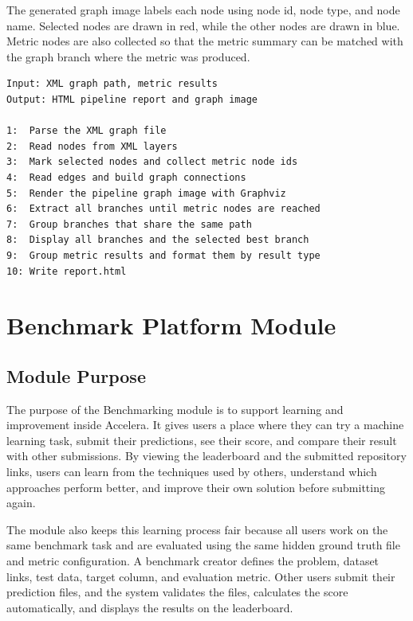 \documentclass[12pt,a4paper,oneside]{report}
\begin{document}
\noindent The generated graph image labels each node using node id, node type, and node
name. Selected nodes are drawn in red, while the other nodes are drawn in blue.
Metric nodes are also collected so that the metric summary can be matched with
the graph branch where the metric was produced.

\begin{lstlisting}[style=algostyle,caption={Pipeline graph report generation flow}]
Input: XML graph path, metric results
Output: HTML pipeline report and graph image

1:  Parse the XML graph file
2:  Read nodes from XML layers
3:  Mark selected nodes and collect metric node ids
4:  Read edges and build graph connections
5:  Render the pipeline graph image with Graphviz
6:  Extract all branches until metric nodes are reached
7:  Group branches that share the same path
8:  Display all branches and the selected best branch
9:  Group metric results and format them by result type
10: Write report.html
\end{lstlisting}


\section{Benchmark Platform Module}



\subsection{Module Purpose}

The purpose of the Benchmarking module is to support learning and improvement
inside Accelera. It gives users a place where they can try a machine learning
task, submit their predictions, see their score, and compare their result with
other submissions. By viewing the leaderboard and the submitted repository
links, users can learn from the techniques used by others, understand which
approaches perform better, and improve their own solution before submitting
again.

\noindent The module also keeps this learning process fair because all users work on the
same benchmark task and are evaluated using the same hidden ground truth file
and metric configuration. A benchmark creator defines the problem, dataset
links, test data, target column, and evaluation metric. Other users submit their
prediction files, and the system validates the files, calculates the score
automatically, and displays the results on the leaderboard.
\end{document}
